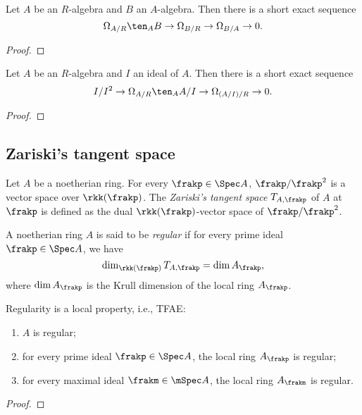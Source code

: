     \begin{theorem}\label{thm: the first exact sequence of differentials}
        Let \(A\) be an \(R\)-algebra and \(B\) an \(A\)-algebra. 
        Then there is a short exact sequence
        \[ \Omega_{A/R} \ten_A B \to \Omega_{B/R} \to \Omega_{B/A} \to 0. \]
    \end{theorem}
    \begin{proof}
    \end{proof}

    \begin{theorem}\label{thm: the second exact sequence of differentials}
        Let \(A\) be an \(R\)-algebra and \(I\) an ideal of \(A\).
        Then there is a short exact sequence
        \[ I/I^2 \to \Omega_{A/R} \ten_A A/I \to \Omega_{(A/I)/R} \to 0. \]
    \end{theorem}
    \begin{proof}
    \end{proof}

\subsection{Zariski's tangent space}

    \begin{definition}\label{def: Zariski's tangent space}
        Let \(A\) be a noetherian ring.
        For every $\frakp \in \Spec A$, \(\frakp/\frakp^2\) is a vector space over \(\rkk(\frakp)\).
        The \emph{Zariski's tangent space} $T_{A,\frakp}$ of \(A\) at \(\frakp\) is defined as the dual \(\rkk(\frakp)\)-vector space of \(\frakp/\frakp^2\).
    \end{definition}

    \begin{definition}\label{def: regular ring}
        A noetherian ring \(A\) is said to be \emph{regular} if for every prime ideal \(\frakp \in \Spec A\), we have 
        \[ \dim_{\rkk(\frakp)} T_{A,\frakp} = \dim A_\frakp, \]
        where \(\dim A_\frakp\) is the Krull dimension of the local ring \(A_\frakp\).
    \end{definition}

    \begin{proposition}\label{prop: regularity is a local property}
        Regularity is a local property, i.e., TFAE:
        \begin{enumerate}
            \item \(A\) is regular;
            \item for every prime ideal \(\frakp \in \Spec A\), the local ring \(A_\frakp\) is regular;
            \item for every maximal ideal \(\frakm \in \mSpec A\), the local ring \(A_\frakm\) is regular.
        \end{enumerate}
    \end{proposition}
    \begin{proof}
    \end{proof}

